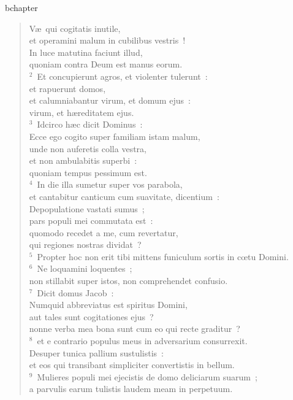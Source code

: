 bchapter\begin{verse}\vspace{-19pt}V\ae\ qui cogitatis inutile,\\ et operamini malum in cubilibus vestris~!\\ In luce matutina faciunt illud,\\ quoniam contra Deum est manus eorum.\\
${}^{2}$~Et concupierunt agros, et violenter tulerunt~:\\ et rapuerunt domos,\\ et calumniabantur virum, et domum ejus~:\\ virum, et h\ae reditatem ejus.\\
${}^{3}$~Idcirco h\ae c dicit Dominus~:\\ Ecce ego cogito super familiam istam malum,\\ unde non auferetis colla vestra,\\ et non ambulabitis superbi~:\\ quoniam tempus pessimum est.\\
${}^{4}$~In die illa sumetur super vos parabola,\\ et cantabitur canticum cum suavitate, dicentium~:\\ Depopulatione vastati sumus~;\\ pars populi mei commutata est~:\\ quomodo recedet a me, cum revertatur,\\ qui regiones nostras dividat~?\\
${}^{5}$~Propter hoc non erit tibi mittens funiculum sortis in cœtu Domini.\\
${}^{6}$~Ne loquamini loquentes~;\\ non stillabit super istos, non comprehendet confusio.\\
${}^{7}$~Dicit domus Jacob~:\\ Numquid abbreviatus est spiritus Domini,\\ aut tales sunt cogitationes ejus~?\\ nonne verba mea bona sunt cum eo qui recte graditur~?\\
${}^{8}$~et e contrario populus meus in adversarium consurrexit.\\ Desuper tunica pallium sustulistis~:\\ et eos qui transibant simpliciter convertistis in bellum.\\
${}^{9}$~Mulieres populi mei ejecistis de domo deliciarum suarum~;\\ a parvulis earum tulistis laudem meam in perpetuum.\\

\end{verse}
